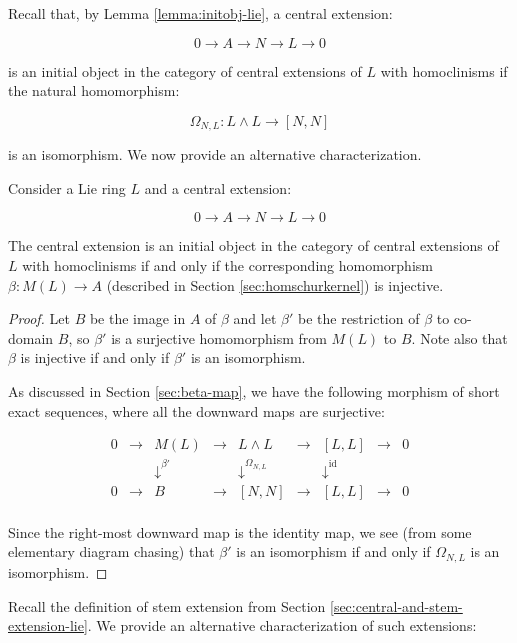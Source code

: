 Recall that, by Lemma \ref{lemma:initobj-lie}, a central extension:

$$0 \to A \to N \to L \to 0$$

is an initial object in the category of central extensions of $L$ with
homoclinisms if the natural homomorphism:

$$\Omega_{N,L}: L \wedge L \to [N,N]$$

is an isomorphism. We now provide an alternative characterization.

\begin{lemma}\label{lemma:initial-beta-injective-lie}
  Consider a Lie ring $L$ and a central extension:

  $$0 \to A \to N \to L \to 0$$

  The central extension is an initial object in the category of
  central extensions of $L$ with homoclinisms if and only if the
  corresponding homomorphism $\beta:M(L) \to A$ (described in Section
  \ref{sec:homschurkernel}) is injective.
\end{lemma}

\begin{proof}
  Let $B$ be the image in $A$ of $\beta$ and let $\beta'$ be the
  restriction of $\beta$ to co-domain $B$, so $\beta'$ is a surjective
  homomorphism from $M(L)$ to $B$. Note also that $\beta$ is injective
  if and only if $\beta'$ is an isomorphism.

  As discussed in Section \ref{sec:beta-map}, we have the following
  morphism of short exact sequences, where all the downward maps are
  surjective:

  $$\begin{array}{ccccccccc}
    0 & \to & M(L) & \to & L \wedge L & \to & [L,L] & \to & 0\\
    &&   \downarrow^{\beta'}  &&  \downarrow^{\Omega_{N,L}}     && \downarrow^{\text{id}} && \\
    0 & \to & B &\to & [N,N] & \to & [L,L] & \to & 0\\
  \end{array}$$
  
  Since the right-most downward map is the identity map, we see (from
  some elementary diagram chasing) that $\beta'$ is an isomorphism if
  and only if $\Omega_{N,L}$ is an isomorphism. 
\end{proof}

Recall the definition of stem extension from Section
\ref{sec:central-and-stem-extension-lie}. We provide an alternative
characterization of such extensions:

